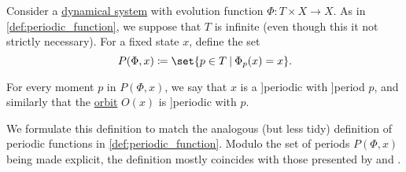 \begin{definition}\label{def:dynamical_system_periodicity}\mimprovised
  Consider a \hyperref[def:dynamical_system]{dynamical system} with evolution function \( \Phi: T \times X \to X \). As in \cref{def:periodic_function}, we suppose that \( T \) is infinite (even though this it not strictly necessary). For a fixed state \( x \), define the set
  \begin{equation*}
    P(\Phi, x) \coloneqq \set{ p \in T \given \Phi_p(x) = x }.
  \end{equation*}

  For every  moment \( p \) in \( P(\Phi, x) \), we say that \( x \) is a \term[en=periodic (point) (\incite[def. 11(iii)]{GiuntiMazzola2012DynamicalSystemsOnMonoids}]{periodic} with \term[en=period (\incite[def. 11(ii)]{GiuntiMazzola2012DynamicalSystemsOnMonoids}]{period} \( p \), and similarly that the \hyperref[def:dynamical_system_trajectory]{orbit} \( O(x) \) is \term[en=periodic (orbit) (\incite[def. 12(i)]{GiuntiMazzola2012DynamicalSystemsOnMonoids}]{periodic} with  \( p \).
\end{definition}
\begin{comments}
  \item We formulate this definition to match the analogous (but less tidy) definition of periodic functions in \cref{def:periodic_function}. Modulo the set of periods \( P(\Phi, x) \) being made explicit, the definition mostly coincides with those presented by  and .
\end{comments}

